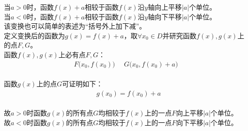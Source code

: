 \documentclass[UTF8]{ctexart}
\begin{document}
    当$a>0$时，函数$f(x)+a$相较于函数$f(x)$沿$y$轴向上平移$|a|$个单位。\\[3mm]
    当$a<0$时，函数$f(x)+a$相较于函数$f(x)$沿$y$轴向下平移$|a|$个单位。\\[3mm]
    该变换也可以简单的表述为“括号外上加下减”。\\[6mm]
    定义变换后的函数为$g(x)=f(x)+a$，取$\forall x_0\in D$并研究函数$f(x),g(x)$上的点$F,G$。\\[3mm]
    函数$f(x),g(x)$上必有点$F,G$：
    \begin{align}
        F\big(x_0,f(x_0)\big)~~~~~~G\big(x_0,f(x_0)+a\big)
    \end{align}\\
    函数$g(x)$上的点$G$可证明如下：
    \begin{align}
        &g(x_0)=f(x_0)+a
    \end{align}\\
    故$a>0$时函数$g(x)$的所有点$G$均相较于$f(x)$上的一点$F$向上平移$|a|$个单位。\\[3mm]
    故$a<0$时函数$g(x)$的所有点$G$均相较于$f(x)$上的一点$F$向下平移$|a|$个单位。

\newpage
\end{document}
